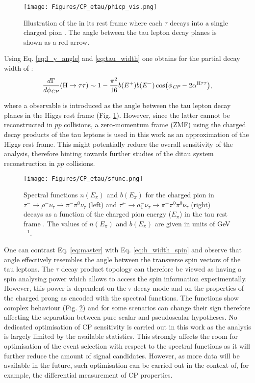 \begin{figure}[t!]
    \centering
    \texttt{[image: Figures/CP\_etau/phicp\_vis.png]}
    \caption{Illustration of the \htt in its rest frame where each $\tau$ decays into a single charged pion \cite{CMS:2021sdq}. The \phicp angle between the tau lepton decay planes is shown as a red arrow.}
    \label{fig:phicp_vis}
\end{figure}

Using Eq. \ref{eq:l_y_angle} and \ref{eq:tau_width} one obtains for the partial decay width of \htt:
\begin{equation}\label{eq:master}
    \dfrac{d\Gamma}{d\phi_{\textit{CP}}}(\text{H} \rightarrow \tau\tau) \sim 1 - \dfrac{\pi^2}{16}b(E^+)b(E^-)\cos(\phi_{\textit{CP}} - 2\alpha^{\text{H}\tau\tau}),
\end{equation}

where a \phicp observable is introduced as the angle between the tau lepton decay planes in the Higgs rest frame (Fig. \ref{fig:phicp_vis}). However, since the latter cannot be reconstructed in $pp$ collisions, a zero-momentum frame (ZMF) using the charged decay products of the tau leptons is used in this work as an approximation of the Higgs rest frame. This might potentially reduce the overall sensitivity of the analysis, therefore hinting towards further studies of the ditau system reconstruction in $pp$ collisions.

\begin{figure}[t!]
    \centering
    \texttt{[image: Figures/CP\_etau/sfunc.png]}
    \caption{Spectral functions $n(E_\pi)$ and $b(E_\pi)$ for the charged pion in $\tau^- \to \rho^- \nu_\tau \to \pi^-\pi^0\nu_\tau$ (left) and $\tau^\pm \to a_1^- \nu_\tau \to \pi^-\pi^0\pi^0\nu_\tau$ (right) decays as a function of the charged pion energy ($E_\pi$) in the tau rest frame \cite{Berge:2011ij}. The values of $n(E_\pi)$ and $b(E_\pi)$ are given in units of GeV$^{-1}$.}
    \label{fig:sfunc}
\end{figure}

One can contrast Eq. \ref{eq:master} with Eq. \ref{eq:h_width_spin} and observe that \phicp angle effectively resembles the angle between the transverse spin vectors of the tau leptons. The $\tau$ decay product topology can therefore be viewed as having a spin analysing power which allows to access the spin information experimentally. However, this power is dependent on the $\tau$ decay mode and on the properties of the charged prong as encoded with the spectral functions. The functions show complex behaviour (Fig. \ref{fig:sfunc}) and for some scenarios can change their sign therefore affecting the separation between pure scalar and pseudoscalar hypotheses. No dedicated optimisation of CP sensitivity is carried out in this work as the analysis is largely limited by the available statistics. This strongly affects the room for optimisation of the event selection with respect to the spectral functions as it will further reduce the amount of signal candidates. However, as more data will be available in the future, such optimisation can be carried out in the context of, for example, the differential measurement of CP \htt properties.

